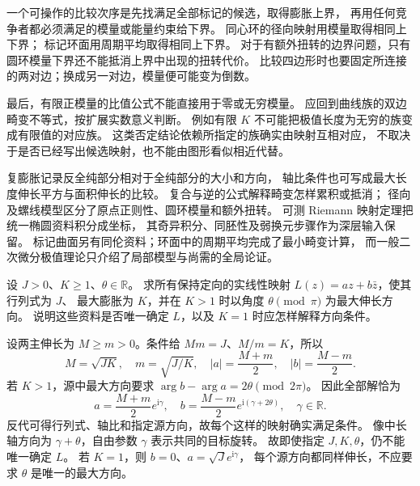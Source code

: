 \ProseParagraphBreak

一个可操作的比较次序是先找满足全部标记的候选，取得膨胀上界，
再用任何竞争者都必须满足的模量或能量约束给下界。
同心环的径向映射用模量取得相同上下界；
标记环面用周期平均取得相同上下界。
对于有额外扭转的边界问题，只有圆环模量下界还不能抵消上界中出现的扭转代价。
比较四边形时也要固定所连接的两对边；换成另一对边，模量便可能变为倒数。

\ProseParagraphBreak

最后，有限正模量的比值公式不能直接用于零或无穷模量。
应回到曲线族的双边畸变不等式，按扩展实数意义判断。
例如有限 \(K\) 不可能把极值长度为无穷的族变成有限值的对应族。
这类否定结论依赖所指定的族确实由映射互相对应，
不取决于是否已经写出候选映射，也不能由图形看似相近代替。

\begin{chaptersummary}
复膨胀记录反全纯部分相对于全纯部分的大小和方向，
轴比条件也可写成最大长度伸长平方与面积伸长的比较。
复合与逆的公式解释畸变怎样累积或抵消；
径向及螺线模型区分了原点正则性、圆环模量和额外扭转。
可测 Riemann 映射定理把统一椭圆资料积分成坐标，
其奇异积分、同胚性及弱换元步骤作为深层输入保留。
标记曲面另有同伦资料；环面中的周期平均完成了最小畸变计算，
而一般二次微分极值理论只介绍了局部模型与尚需的全局论证。
\end{chaptersummary}
\BookExercises

\begin{exercise}\label{b3:ex:B-1}
设 \(J>0\)、\(K\ge1\)、\(\theta\in\mathbb R\)。
求所有保持定向的实线性映射 \(L(z)=az+b\bar z\)，使其行列式为 \(J\)、
最大膨胀为 \(K\)，并在 \(K>1\) 时以角度 \(\theta\pmod\pi\) 为最大伸长方向。
说明这些资料是否唯一确定 \(L\)，以及 \(K=1\) 时应怎样解释方向条件。
\end{exercise}
\begin{solution}
设两主伸长为 \(M\ge m>0\)。条件给 \(Mm=J\)、\(M/m=K\)，所以
\[
 M=\sqrt{JK},\quad m=\sqrt{J/K},\quad
 |a|=\frac{M+m}2,\quad |b|=\frac{M-m}2.
\]
若 \(K>1\)，源中最大方向要求
\(\arg b-\arg a=2\theta\pmod{2\pi}\)。
因此全部解恰为
\[
 a=\frac{M+m}2e^{\mathrm i\gamma},\quad
 b=\frac{M-m}2e^{\mathrm i(\gamma+2\theta)},
 \quad \gamma\in\mathbb R.
\]
反代可得行列式、轴比和指定源方向，故每个这样的映射确实满足条件。
像中长轴方向为 \(\gamma+\theta\)，自由参数 \(\gamma\) 表示共同的目标旋转。
故即使指定 \(J,K,\theta\)，仍不能唯一确定 \(L\)。
若 \(K=1\)，则 \(b=0\)、\(a=\sqrt J e^{\mathrm i\gamma}\)，
每个源方向都同样伸长，不应要求 \(\theta\) 是唯一的最大方向。
\end{solution}

